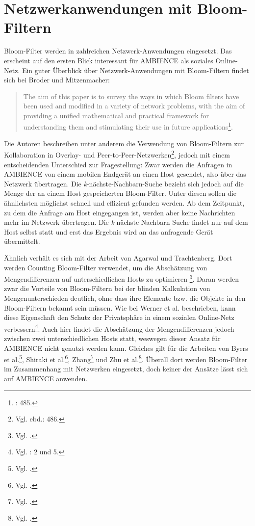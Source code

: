 \section{Netzwerkanwendungen mit Bloom-Filtern}\label{sec:bloom-netzwerk}
Bloom-Filter werden in zahlreichen Netzwerk-Anwendungen eingesetzt. Das erscheint auf den ersten Blick interessant für AMBIENCE als soziales Online-Netz. Ein guter Überblick über Netzwerk-Anwendungen mit Bloom-Filtern findet sich bei Broder und Mitzenmacher:  
\begin{quote}
The aim of this paper is to survey the ways in which Bloom filters have been used and modified in a variety of network problems, with the aim of providing a unified mathematical and practical framework for understanding them and stimulating their use in future applications\footnote{\cite{Broder2004}: 485.}.
\end{quote}
Die Autoren beschreiben unter anderem die Verwendung von Bloom-Filtern zur Kollaboration in Overlay- und Peer-to-Peer-Netzwerken\footnote{Vgl. ebd.: 486.}, jedoch mit einem entscheidenden Unterschied zur Fragestellung: Zwar werden die Anfragen in AMBIENCE von einem mobilen Endgerät an einen Host gesendet, also über das Netzwerk übertragen. Die \textit{k}-nächste-Nachbarn-Suche bezieht sich jedoch auf die Menge der an einem Host gespeicherten Bloom-Filter. Unter diesen sollen die ähnlichsten möglichst schnell und effizient gefunden werden. Ab dem Zeitpunkt, zu dem die Anfrage am Host eingegangen ist, werden aber keine Nachrichten mehr im Netzwerk übertragen. Die \textit{k}-nächste-Nachbarn-Suche findet nur auf dem Host selbst statt und erst das Ergebnis wird an das anfragende Gerät übermittelt. 

Ähnlich verhält es sich mit der Arbeit von Agarwal und Trachtenberg. Dort werden Counting Bloom-Filter verwendet, um die Abschätzung von Mengendifferenzen auf unterschiedlichen Hosts zu optimieren \footnote{Vgl. \cite{Agarwal2006}.}. Daran werden zwar die Vorteile von Bloom-Filtern bei der blinden Kalkulation von Mengenunterschieden deutlich, ohne dass ihre Elemente bzw. die Objekte in den Bloom-Filtern bekannt sein müssen. Wie bei Werner et al. beschrieben, kann diese Eigenschaft den Schutz der Privatsphäre in einem sozialen Online-Netz verbessern\footnote{Vgl. \cite{Werner2015}: 2 und 5.}. Auch hier findet die Abschätzung der Mengendifferenzen jedoch zwischen zwei unterschiedlichen Hosts statt, weswegen dieser Ansatz für AMBIENCE nicht genutzt werden kann. Gleiches gilt für die Arbeiten von Byers et al.\footnote{Vgl. \cite{Byers2002}.}, Shiraki et al.\footnote{Vgl. \cite{Shiraki2009}.}, Zhang\footnote{Vgl. \cite{Zhang2012}.} und Zhu et al.\footnote{Vgl. \cite{Zhu2004}.}. Überall dort werden Bloom-Filter im Zusammenhang mit Netzwerken eingesetzt, doch keiner der Ansätze lässt sich auf AMBIENCE anwenden. 
